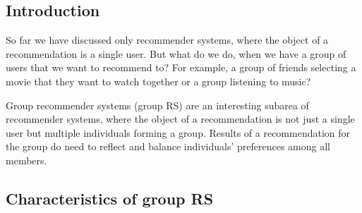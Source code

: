 \subsection{Introduction}\label{subsec:01_group_rec_sys.introduction}
So far we have discussed only recommender systems, where the object of a recommendation is a single user. But what do we do, when we have a group of users that we want to recommend to? For example, a group of friends selecting a movie that they want to watch together or a group listening to music? %

Group recommender systems (group RS) are an interesting subarea of recommender systems, where the object of a recommendation is not just a single user but multiple individuals forming a group. Results of a recommendation for the group do need to reflect and balance individuals' preferences among all members.

\subsection{Characteristics of group RS}
